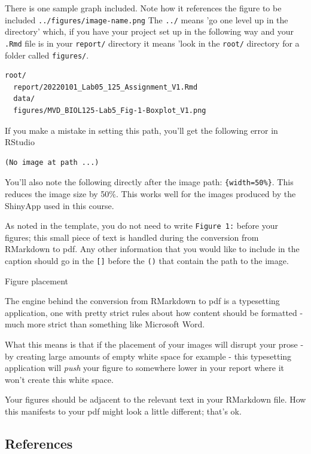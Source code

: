 \documentclass[
]{book}
\begin{document}
There is one sample graph included. Note how it references the figure to be included \texttt{../figures/image-name.png} The \texttt{../} means 'go one level up in the directory' which, if you have your project set up in the following way and your \texttt{.Rmd} file is in your \texttt{report/} directory it means 'look in the \texttt{root/} directory for a folder called \texttt{figures/}.

\begin{verbatim}
root/
  report/20220101_Lab05_125_Assignment_V1.Rmd
  data/
  figures/MVD_BIOL125-Lab5_Fig-1-Boxplot_V1.png
\end{verbatim}

If you make a mistake in setting this path, you'll get the following error in RStudio

\begin{verbatim}
(No image at path ...)
\end{verbatim}

You'll also note the following directly after the image path: \texttt{\{width=50\%\}}. This reduces the image size by 50\%. This works well for the images produced by the ShinyApp used in this course.

As noted in the template, you do not need to write \texttt{Figure\ 1:} before your figures; this small piece of text is handled during the conversion from RMarkdown to pdf. Any other information that you would like to include in the caption should go in the \texttt{{[}{]}} before the \texttt{()} that contain the path to the image.

Figure placement

The engine behind the conversion from RMarkdown to pdf is a typesetting application, one with pretty strict rules about how content should be formatted - much more strict than something like Microsoft Word.

What this means is that if the placement of your images will disrupt your prose - by creating large amounts of empty white space for example - this typesetting application will \emph{push} your figure to somewhere lower in your report where it won't create this white space.

Your figures should be adjacent to the relevant text in your RMarkdown file. How this manifests to your pdf might look a little different; that's ok.

\hypertarget{references-1}{%
\subsection*{References}\label{references-1}}
\end{document}
